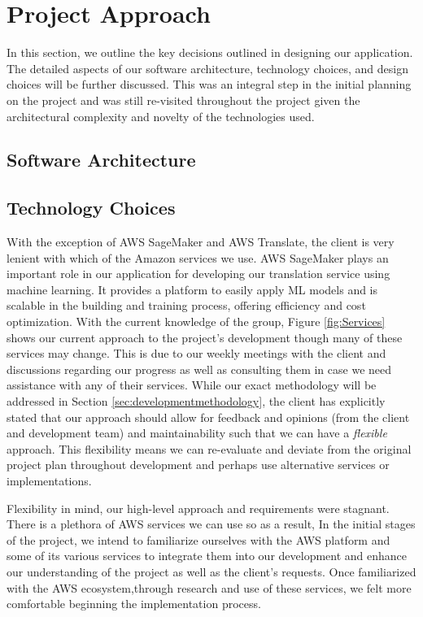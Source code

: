 \section{Project Approach}
\label{sec:projectapproach}

In this section, we outline the key decisions outlined in designing our application. The detailed aspects of our software architecture, technology choices, and design choices will be further discussed. This was an integral step in the initial planning on the project and was still re-visited throughout the project given the architectural complexity and novelty of the technologies used.

\subsection{Software Architecture}

\subsection{Technology Choices}

\indent \indent With the exception of AWS SageMaker and AWS Translate, the client is very lenient with which of the Amazon services we use. AWS SageMaker plays an important role in our application for developing our translation service using machine learning. It provides a platform to easily apply ML models and is scalable in the building and training process, offering efficiency and cost optimization. With the current knowledge of the group, Figure \ref{fig:Services} shows our current approach to the project's development though many of these services may change. This is due to our weekly meetings with the client and discussions regarding our progress as well as consulting them in case we need assistance with any of their services. While our exact methodology will be addressed in Section \ref{sec:developmentmethodology}, the client has explicitly stated that our approach should allow for feedback and opinions (from the client and development team) and maintainability such that we can have a \textit{flexible} approach. This flexibility means we can re-evaluate and deviate from the original project plan throughout development and perhaps use alternative services or implementations. 

\indent Flexibility in mind, our high-level approach and requirements were stagnant. There is a plethora of AWS services we can use so as a result, In the initial stages of the project, we intend to familiarize ourselves with the AWS platform and some of its various services to integrate them into our development and enhance our understanding of the project as well as the client's requests. Once familiarized with the AWS ecosystem,through research and use of these services, we felt more comfortable beginning the implementation process.

